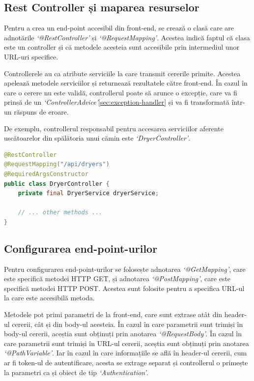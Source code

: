 \documentclass[12pt,a4paper]{report}
\theoremstyle{definition}
\theoremstyle{remark}
\begin{document}
\subsection{Rest Controller și maparea resurselor}

\par Pentru a crea un end-point accesibil din front-end, se crează o clasă care are adnotările \textit{`@RestController'} și \textit{`@RequestMapping'}\cite{burke2009restful}. Acestea indică faptul că clasa este un controller și că metodele acesteia sunt accesibile prin intermediul unor URL-uri specifice.

\par Controllerele au ca atribute serviciile la care transmit cererile primite. Acestea apelează metodele serviciilor și returnează rezultatele către front-end. În cazul în care o cerere nu este validă, controllerul poate să arunce o excepție, care va fi prinsă de un \textit{`ControllerAdvice'}\ref{sec:exception-handler} și va fi transformată într-un răspuns de eroare.

\par De exemplu, controllerul responsabil pentru accesarea serviciilor aferente \textnormal{us\-că\-toa\-re\-lor} din spălătoria unui cămin este \textit{`DryerController'}.

\begin{lstlisting}[language=Java, caption={Clasa DryerController}]
@RestController
@RequestMapping("/api/dryers")
@RequiredArgsConstructor
public class DryerController {
    private final DryerService dryerService;

    // ... other methods ...
}
\end{lstlisting}

\subsection{Configurarea end-point-urilor}

\par Pentru configurarea end-point-urilor se folosește adnotarea \textit{`@GetMapping'}, care este specifică metodei HTTP GET, și adnotarea \textit{`@PostMapping'}, care este specifică metodei HTTP POST\cite{varanasi2015spring}. Acestea sunt folosite pentru a specifica URL-ul la care este accesibilă metoda.

\par Metodele pot primi parametri de la front-end, care sunt extrase atât din header-ul cererii, cât și din body-ul acesteia. În cazul în care parametrii sunt trimiși în body-ul cererii, aceștia sunt obținuți prin anotarea \textit{`@RequestBody'}. În cazul în care parametrii sunt trimiși în URL-ul cererii, aceștia sunt obținuți prin anotarea \textit{`@PathVariable'}. Iar în cazul în care informațiile se află în header-ul cererii, cum ar fi token-ul de autentificare, acesta se extrage separat și controllerul o primește la parametri ca și obiect de tip \textit{`Authentication'}.
\end{document}
